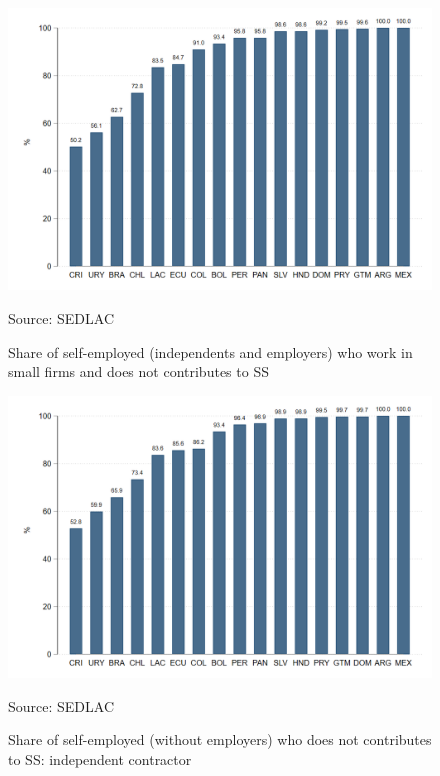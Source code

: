 \documentclass[english]{article}
\begin{document}
\begin{figure}[H]
            \justifying
                \caption{Share of self-employed (independents and employers) who work in small firms and does not contributes to SS}  
            \centerline{\includegraphics[scale=.3]{latex/figures/Self-employed/i_selfsmall.png}}
                \label{fig:owner-}
                \footnotesize{Source: SEDLAC}
\end{figure}

\begin{figure}[H]
            \justifying
                \caption{Share of self-employed (without employers) who does not contributes to SS: independent contractor}  
            \centerline{\includegraphics[scale=.3]{latex/figures/Self-employed/i_independent.png}}
                \label{fig:owner-}
                \footnotesize{Source: SEDLAC}
\end{figure}
\end{document}
